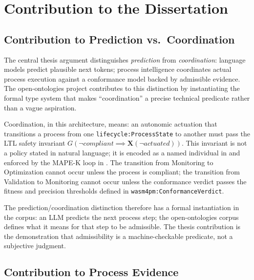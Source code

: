 
\section{Contribution to the Dissertation}
\label{sec:research-open-ontologies-contribution}

\subsection{Contribution to Prediction vs.~Coordination}
\label{sec:research-open-ontologies-contrib-prediction}

The central thesis argument distinguishes \emph{prediction} from \emph{coordination}: language
models predict plausible next tokens; process intelligence coordinates actual process execution
against a conformance model backed by admissible evidence. The open-ontologies project
contributes to this distinction by instantiating the formal type system that makes
``coordination'' a precise technical predicate rather than a vague aspiration.

Coordination, in this architecture, means: an autonomic actuation that transitions a process
from one \texttt{lifecycle:ProcessState} to another must pass the LTL safety invariant
$G(\neg\mathit{compliant} \implies \mathbf{X}(\neg\mathit{actuated}))$. This invariant is not
a policy stated in natural language; it is encoded as a named individual in
 and enforced by the MAPE-K loop in .
The transition from Monitoring to Optimization cannot occur unless the process is compliant;
the transition from Validation to Monitoring cannot occur unless the conformance verdict
passes the fitness and precision thresholds defined in \texttt{wasm4pm:ConformanceVerdict}.

The prediction/coordination distinction therefore has a formal instantiation in the corpus:
an LLM predicts the next process step; the open-ontologies corpus defines what it means for
that step to be admissible. The thesis contribution is the demonstration that admissibility is
a machine-checkable predicate, not a subjective judgment.

\subsection{Contribution to Process Evidence}
\label{sec:research-open-ontologies-contrib-evidence}

